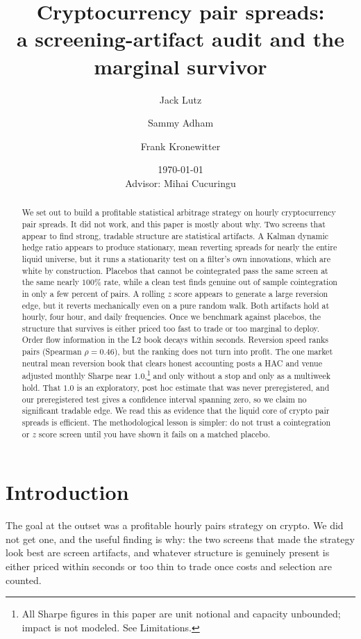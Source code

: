 \documentclass[11pt]{article}
\title{Cryptocurrency pair spreads:\\
a screening-artifact audit and the marginal survivor}
\author{Jack Lutz \and Sammy Adham \and Frank Kronewitter}
\date{\today\\[0.4em]\small Advisor: Mihai Cucuringu}
\begin{document}
\maketitle

\begin{abstract}
We set out to build a profitable statistical arbitrage strategy on hourly cryptocurrency
pair spreads. It did not work, and this paper is mostly about why.
Two screens that appear to find strong, tradable structure are statistical artifacts. A
Kalman dynamic hedge ratio appears to produce stationary, mean reverting spreads for nearly
the entire liquid universe, but it runs a stationarity test on a filter's own innovations,
which are white by construction. Placebos that cannot be cointegrated pass the same screen at
the same nearly $100\%$ rate, while a clean test finds genuine out of sample cointegration in
only a few percent of pairs. A rolling $z$ score appears to generate a large reversion edge,
but it reverts mechanically even on a pure random walk. Both artifacts hold at hourly,
four hour, and daily frequencies. Once we benchmark against placebos, the structure that
survives is either priced too fast to trade or too marginal to deploy. Order flow information in
the L2 book decays within seconds. Reversion speed ranks pairs (Spearman $\rho = 0.46$), but
the ranking does not turn into profit. The one market neutral mean reversion book that clears
honest accounting posts a HAC and venue adjusted monthly Sharpe near $1.0$,\footnote{All Sharpe
figures in this paper are unit notional and capacity unbounded; impact is not modeled. See
Limitations.} and only without a stop and only as a multiweek hold. That $1.0$ is an
exploratory, post hoc estimate that was never preregistered, and our preregistered test gives a
confidence interval spanning zero, so we claim no significant tradable edge. We read this as evidence that the
liquid core of crypto pair spreads is efficient. The methodological lesson is simpler: do not
trust a cointegration or $z$ score screen until you have shown it fails on a matched placebo.
\end{abstract}

\section{Introduction}
\label{sec:intro}

The goal at the outset was a profitable hourly pairs strategy on crypto. We did not get one, and
the useful finding is why: the two screens that made the strategy look best are screen artifacts,
and whatever structure is genuinely present is either priced within seconds or too thin to trade
once costs and selection are counted.
\end{document}
